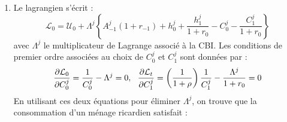 \documentclass[a4paper,11pt]{article}
\begin{document}
\begin{enumerate}

\item Le lagrangien s'\'{e}crit :%
\begin{equation*}
\mathcal{L}_{0}=\mathcal{U}_{0}+\Lambda ^{j}\left\{ A_{-1}^{j}\left(
1+r_{-1}\right) +h_{0}^{j} + \frac{h_{1}^{j}}{1+r_0} - C_{0}^{j} - \frac{C_{1}^{j}}{1+r_0} \right\}
\end{equation*}%
avec $\Lambda ^{j}$ le multiplicateur de Lagrange associ\'{e} \`{a} la CBI.
Les conditions de premier ordre associ\'{e}es au choix de $C_{0}^{j}$ et $%
C_{1}^{j}$ sont donn\'{e}es par :%
\begin{equation}
\frac{\partial \mathcal{L}_{0}}{\partial C_{0}^{j}}=\frac{1}{C_{0}^{j}}%
-\Lambda ^{j}=0,\ \ \frac{\partial \mathcal{L}_{t}}{\partial C_{1}^{j}}%
=\left( \frac{1}{1+\rho }\right) \frac{1}{C_{1}^{j}}-\frac{\Lambda ^{j}}{%
1+r_{0}}=0  \label{2 - CPO conso}
\end{equation}%
En utilisant ces deux \'{e}quations pour \'{e}liminer $\Lambda ^{j}$, on
trouve que la consommation d'un m\'{e}nage ricardien satisfait :%


\end{enumerate}
\end{document}
